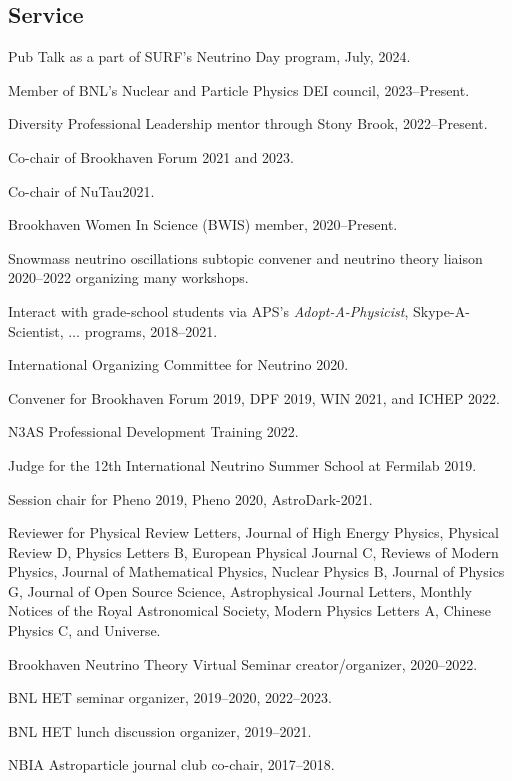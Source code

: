 \documentclass{article}
\renewenvironment{itemize}{
\begin{list}{}{
\setlength{\leftmargin}{.5em}}}{
\end{list}}
\begin{document}
\subsection*{Service}
\begin{itemize}
\item Pub Talk as a part of SURF's Neutrino Day program, July, 2024.
\item Member of BNL's Nuclear and Particle Physics DEI council, 2023--Present.
\item Diversity Professional Leadership mentor through Stony Brook, 2022--Present.
\item Co-chair of Brookhaven Forum 2021 and 2023.
\item Co-chair of NuTau2021.
\item Brookhaven Women In Science (BWIS) member, 2020--Present.
\item Snowmass neutrino oscillations subtopic convener and neutrino theory liaison 2020--2022 organizing many workshops.
\item Interact with grade-school students via APS's \emph{Adopt-A-Physicist}, Skype-A-Scientist, $\dots$ programs, 2018--2021.
\item International Organizing Committee for Neutrino 2020.
\item Convener for Brookhaven Forum 2019, DPF 2019, WIN 2021, and ICHEP 2022.
\item N3AS Professional Development Training 2022.
\item Judge for the 12th International Neutrino Summer School at Fermilab 2019. 
\item Session chair for Pheno 2019, Pheno 2020, AstroDark-2021.
\item Reviewer for Physical Review Letters, Journal of High Energy Physics, Physical Review D, Physics Letters B, European Physical Journal C, Reviews of Modern Physics, Journal of Mathematical Physics, Nuclear Physics B, Journal of Physics G, Journal of Open Source Science, Astrophysical Journal Letters, Monthly Notices of the Royal Astronomical Society, Modern Physics Letters A, Chinese Physics C, and Universe.
\item Brookhaven Neutrino Theory Virtual Seminar creator/organizer, 2020--2022.
\item BNL HET seminar organizer, 2019--2020, 2022--2023.
\item BNL HET lunch discussion organizer, 2019--2021.
\item NBIA Astroparticle journal club co-chair, 2017--2018.
\end{itemize}
\end{document}
